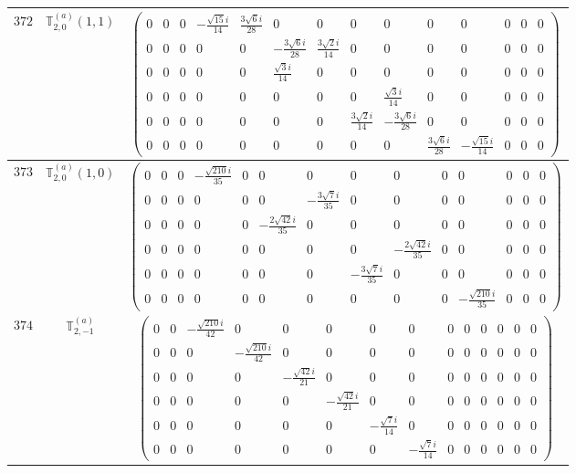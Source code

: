 \documentclass[fleqn,8pt,landscape]{jsarticle}
\begin{document}
\begin{center}
\begin{longtable}{ccc}
$ 372 $ & $ \mathbb{T}_{2,0}^{(a)}(1,1) $ & $ \begin{pmatrix} 0 & 0 & 0 & - \frac{\sqrt{15} i}{14} & \frac{3 \sqrt{6} i}{28} & 0 & 0 & 0 & 0 & 0 & 0 & 0 & 0 & 0 \\ 0 & 0 & 0 & 0 & 0 & - \frac{3 \sqrt{6} i}{28} & \frac{3 \sqrt{2} i}{14} & 0 & 0 & 0 & 0 & 0 & 0 & 0 \\ 0 & 0 & 0 & 0 & 0 & \frac{\sqrt{3} i}{14} & 0 & 0 & 0 & 0 & 0 & 0 & 0 & 0 \\ 0 & 0 & 0 & 0 & 0 & 0 & 0 & 0 & \frac{\sqrt{3} i}{14} & 0 & 0 & 0 & 0 & 0 \\ 0 & 0 & 0 & 0 & 0 & 0 & 0 & \frac{3 \sqrt{2} i}{14} & - \frac{3 \sqrt{6} i}{28} & 0 & 0 & 0 & 0 & 0 \\ 0 & 0 & 0 & 0 & 0 & 0 & 0 & 0 & 0 & \frac{3 \sqrt{6} i}{28} & - \frac{\sqrt{15} i}{14} & 0 & 0 & 0 \end{pmatrix} $ \\ \hline
$ 373 $ & $ \mathbb{T}_{2,0}^{(a)}(1,0) $ & $ \begin{pmatrix} 0 & 0 & 0 & - \frac{\sqrt{210} i}{35} & 0 & 0 & 0 & 0 & 0 & 0 & 0 & 0 & 0 & 0 \\ 0 & 0 & 0 & 0 & 0 & 0 & - \frac{3 \sqrt{7} i}{35} & 0 & 0 & 0 & 0 & 0 & 0 & 0 \\ 0 & 0 & 0 & 0 & 0 & - \frac{2 \sqrt{42} i}{35} & 0 & 0 & 0 & 0 & 0 & 0 & 0 & 0 \\ 0 & 0 & 0 & 0 & 0 & 0 & 0 & 0 & - \frac{2 \sqrt{42} i}{35} & 0 & 0 & 0 & 0 & 0 \\ 0 & 0 & 0 & 0 & 0 & 0 & 0 & - \frac{3 \sqrt{7} i}{35} & 0 & 0 & 0 & 0 & 0 & 0 \\ 0 & 0 & 0 & 0 & 0 & 0 & 0 & 0 & 0 & 0 & - \frac{\sqrt{210} i}{35} & 0 & 0 & 0 \end{pmatrix} $ \\ \hline
$ 374 $ & $ \mathbb{T}_{2,-1}^{(a)} $ & $ \begin{pmatrix} 0 & 0 & - \frac{\sqrt{210} i}{42} & 0 & 0 & 0 & 0 & 0 & 0 & 0 & 0 & 0 & 0 & 0 \\ 0 & 0 & 0 & - \frac{\sqrt{210} i}{42} & 0 & 0 & 0 & 0 & 0 & 0 & 0 & 0 & 0 & 0 \\ 0 & 0 & 0 & 0 & - \frac{\sqrt{42} i}{21} & 0 & 0 & 0 & 0 & 0 & 0 & 0 & 0 & 0 \\ 0 & 0 & 0 & 0 & 0 & - \frac{\sqrt{42} i}{21} & 0 & 0 & 0 & 0 & 0 & 0 & 0 & 0 \\ 0 & 0 & 0 & 0 & 0 & 0 & - \frac{\sqrt{7} i}{14} & 0 & 0 & 0 & 0 & 0 & 0 & 0 \\ 0 & 0 & 0 & 0 & 0 & 0 & 0 & - \frac{\sqrt{7} i}{14} & 0 & 0 & 0 & 0 & 0 & 0 \end{pmatrix} $ \\ \hline

\end{longtable}
\end{center}
\end{document}
